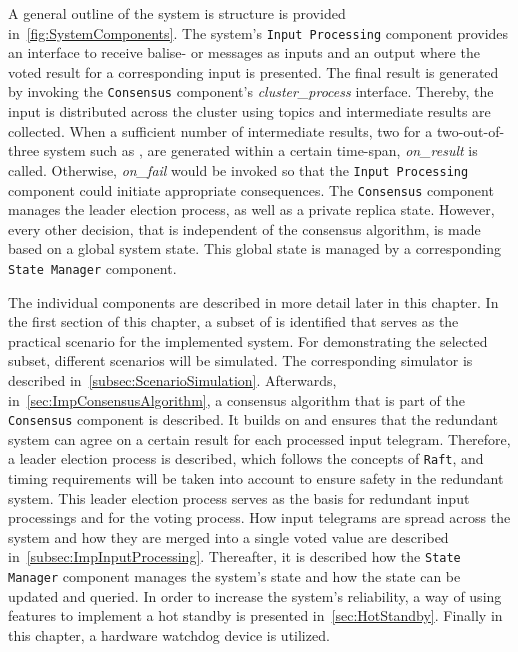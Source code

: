 A general outline of the system is structure is provided in~\autoref{fig:SystemComponents}.
The system's \texttt{Input Processing} component provides an interface to receive balise- or  messages as inputs and an output where the voted result for a corresponding input is presented.
The final result is generated by invoking the \texttt{Consensus} component's \textit{cluster\_process} interface.
Thereby, the input is distributed across the cluster using  topics and intermediate results are collected.
When a sufficient number of intermediate results, two for a two-out-of-three system such as , are generated within a certain time-span, \textit{on\_result} is called.
Otherwise, \textit{on\_fail} would be invoked so that the \texttt{Input Processing} component could initiate appropriate consequences.
The \texttt{Consensus} component manages the leader election process, as well as a private replica state.
However, every other decision, that is independent of the consensus algorithm, is made based on a global system state.
This global state is managed by a corresponding \texttt{State Manager} component.

The individual components are described in more detail later in this chapter.
In the first section of this chapter, a subset of  is identified that serves as the practical scenario for the implemented system.
For demonstrating the selected  subset, different scenarios will be simulated.
The corresponding simulator is described in~\autoref {subsec:ScenarioSimulation}.
Afterwards, in~\autoref{sec:ImpConsensusAlgorithm}, a consensus algorithm that is part of the \texttt{Consensus} component is described.
It builds on  and ensures that the redundant system can agree on a certain result for each processed input telegram.
Therefore, a leader election process is described, which follows the concepts of \texttt{Raft}, and timing requirements will be taken into account to ensure safety in the redundant system.
This leader election process serves as the basis for redundant input processings and for the voting process.
How input telegrams are spread across the system and how they are merged into a single voted value are described in~\autoref{subsec:ImpInputProcessing}.
Thereafter, it is described how the \texttt{State Manager} component manages the system's state and how the state can be updated and queried.
In order to increase the system's reliability, a way of using  features to implement a hot standby is presented in~\autoref{sec:HotStandby}.
Finally in this chapter, a hardware watchdog device is utilized.

